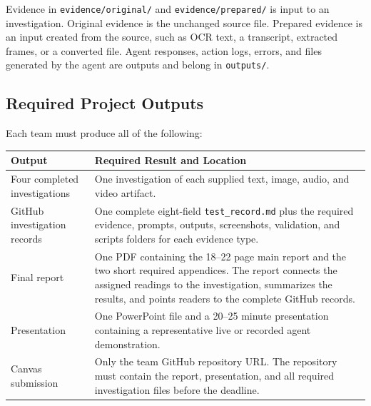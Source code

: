 \documentclass[12pt,letterpaper]{article}
\begin{document}
Evidence in \texttt{evidence/original/} and \texttt{evidence/prepared/} is input to an investigation. Original evidence is the unchanged source file. Prepared evidence is an input created from the source, such as OCR text, a transcript, extracted frames, or a converted file. Agent responses, action logs, errors, and files generated by the agent are outputs and belong in \texttt{outputs/}.

\subsection{Required Project Outputs}
Each team must produce all of the following:

\begin{center}
    \small
    \begin{tabular}{|p{}|p{}|}
        \hline
        \textbf{Output}               & \textbf{Required Result and Location}                                                                                                                                                                                            \\
        \hline
        Four completed investigations & One investigation of each supplied text, image, audio, and video artifact.                                                                                                                                                       \\
        \hline
        GitHub investigation records  & One complete eight-field \texttt{test\_record.md} plus the required evidence, prompts, outputs, screenshots, validation, and scripts folders for each evidence type.                                                             \\
        \hline
        Final report                  & One PDF containing the 18--22 page main report and the two short required appendices. The report connects the assigned readings to the investigation, summarizes the results, and points readers to the complete GitHub records. \\
        \hline
        Presentation                  & One PowerPoint file and a 20--25 minute presentation containing a representative live or recorded agent demonstration.                                                                                                           \\
        \hline
        Canvas submission             & Only the team GitHub repository URL. The repository must contain the report, presentation, and all required investigation files before the deadline.                                                                             \\
        \hline
    \end{tabular}
\end{center}
\end{document}

